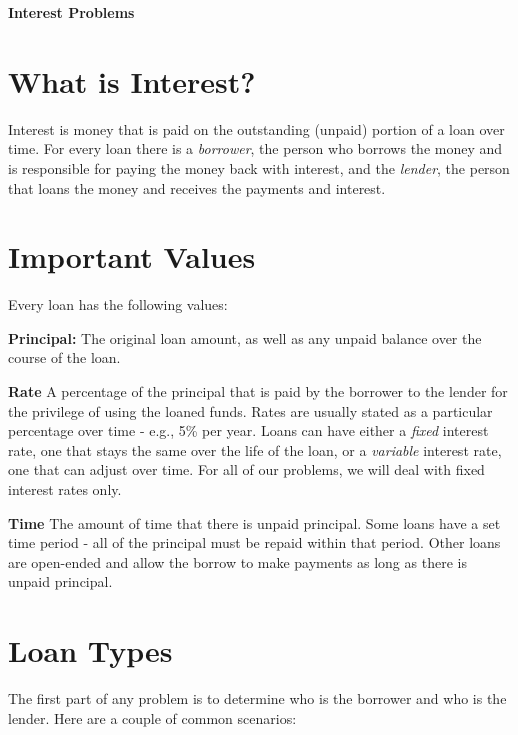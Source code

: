 \documentclass[letterpaper]{article}
\begin{document}
\begin{center}
\textbf{Interest Problems}
\end{center}

\bigskip

\section*{What is Interest?}

Interest is money that is paid on the outstanding (unpaid) portion of a loan
over time. For every loan there is a \emph{borrower}, the person who borrows
the money and is responsible for paying the money back with interest, and the
\emph{lender}, the person that loans the money and receives the payments and
interest.

\section*{Important Values}

Every loan has the following values:

\begin{description}
\item{\textbf{Principal:}} The original loan amount, as well as any unpaid
  balance over the course of the loan.
\item{\textbf{Rate}} A percentage of the principal that is paid by the borrower
  to the lender for the privilege of using the loaned funds.  Rates are usually
  stated as a particular percentage over time - e.g., 5\% per year.  Loans can
  have either a \emph{fixed} interest rate, one that stays the same over the
  life of the loan, or a \emph{variable} interest rate, one that can adjust
  over time.  For all of our problems, we will deal with fixed interest rates
  only.
\item{\textbf{Time}} The amount of time that there is unpaid principal.  Some
  loans have a set time period - all of the principal must be repaid within
  that period.  Other loans are open-ended and allow the borrow to make
  payments as long as there is unpaid principal.
\end{description}

\section*{Loan Types}

The first part of any problem is to determine who is the borrower
and who is the lender.  Here are a couple of common scenarios:
\end{document}
